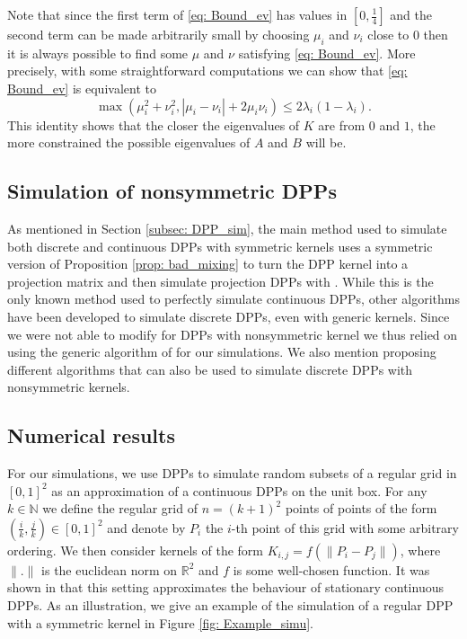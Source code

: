 \documentclass{article}
\numberwithin{equation}{section}
\renewcommand{\leq}{\leqslant}
\newcommand{\bN}{\mathbb{N}}
\newcommand{\bR}{\mathbb{R}}
\theoremstyle{plain}
\begin{document}
\noindent Note that since the first term of \eqref{eq: Bound_ev} has values in $[0, \frac 1 4]$ and the second term can be made arbitrarily small by choosing $\mu_i$ and $\nu_i$ close to $0$ then it is always possible to find some $\mu$ and $\nu$ satisfying \eqref{eq: Bound_ev}. More precisely, with some straightforward computations we can show that \eqref{eq: Bound_ev} is equivalent to
\[\max(\mu_i^2 + \nu_i^2, |\mu_i - \nu_i| + 2\mu_i\nu_i)\leq 2\lambda_i(1-\lambda_i).\]
This identity shows that the closer the eigenvalues of 
$K$ are from $0$ and $1$, the more constrained the possible eigenvalues of $A$ and $B$ will be.

\subsection{Simulation of nonsymmetric DPPs}

As mentioned in Section \ref{subsec: DPP_sim}, the main method used to simulate both discrete and continuous DPPs with symmetric kernels uses a symmetric version of Proposition \ref{prop: bad_mixing} to turn the DPP kernel into a projection matrix and then simulate projection DPPs with \cite[Algorithm 4.4.2]{Hough}. While this is the only known method used to perfectly simulate continuous DPPs, other algorithms have been developed to simulate discrete DPPs, even with generic kernels. Since we were not able to modify \cite[Algorithm 4.4.2]{Hough} for DPPs with nonsymmetric kernel we thus relied on using the generic algorithm of \cite{Poulson} for our simulations. We also mention \cite{Han, Launay} proposing different algorithms that can also be used to simulate discrete DPPs with nonsymmetric kernels.

\subsection{Numerical results}

For our simulations, we use DPPs to simulate random subsets of a regular grid in $[0, 1]^2$ as an approximation of a continuous DPPs on the unit box. For any $k\in\bN$ we define the regular grid of $n=(k+1)^2$ points of points of the form $(\frac{i}{k}, \frac{j}{k})\in[0, 1]^2$ and denote by $P_i$ the $i$-th point of this grid with some arbitrary ordering. We then consider kernels of the form $K_{i,j}=f(\|P_i-P_j\|)$, where $\|.\|$ is the euclidean norm on $\bR^2$ and $f$ is some well-chosen function. It was shown in \cite{Poinas} that this setting approximates the behaviour of stationary continuous DPPs. As an illustration, we give an example of the simulation of a regular DPP with a symmetric kernel in Figure \ref{fig: Example_simu}.
\end{document}
